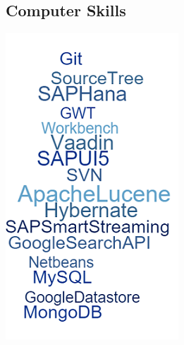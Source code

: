 \documentclass[]{friggeri-cv}
\begin{document}
\begin{aside}
    \section{Computer Skills}
    \includegraphics[scale=0.62]{img/skills.png}
    ~
  
\end{aside}
\end{document}
